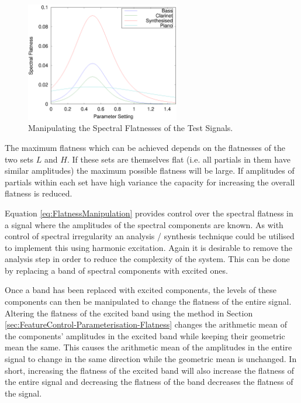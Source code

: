 			\begin{figure}[h!]
				\centering
				\includegraphics[width=0.6\textwidth]{chapter6/Images/MoveFlatnesses.eps}
				\caption{Manipulating the Spectral Flatnesses of the Test Signals.}
				\label{fig:MoveFlatnesses}
			\end{figure}

			The maximum flatness which can be achieved depends on the flatnesses of the two sets $L$ and $H$.
			If these sets are themselves flat (i.e. all partials in them have similar amplitudes) the maximum
			possible flatness will be large. If amplitudes of partials within each set have high variance the
			capacity for increasing the overall flatness is reduced.

			Equation \ref{eq:FlatnessManipulation} provides control over the spectral flatness in a signal
			where the amplitudes of the spectral components are known. As with control of spectral irregularity
			an analysis / synthesis technique could be utilised to implement this using harmonic excitation.
			Again it is desirable to remove the analysis step in order to reduce the complexity of the system.
			This can be done by replacing a band of spectral components with excited ones.

			Once a band has been replaced with excited components, the levels of these components can then be
			manipulated to change the flatness of the entire signal. Altering the flatness of the excited band
			using the method in Section \ref{sec:FeatureControl-Parameterisation-Flatness} changes the
			arithmetic mean of the components' amplitudes in the excited band while keeping their geometric
			mean the same. This causes the arithmetic mean of the amplitudes in the entire signal to change in
			the same direction while the geometric mean is unchanged. In short, increasing the flatness of the
			excited band will also increase the flatness of the entire signal and decreasing the flatness of
			the band decreases the flatness of the signal.

